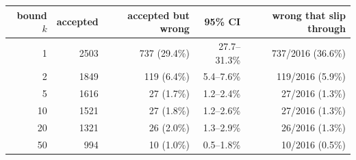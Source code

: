 \begin{tabular}{rrrrr}
\toprule
bound $k$ & accepted & accepted but wrong & 95\% CI & wrong that slip through \\
\midrule
1 & 2503 & 737 (29.4\%) & 27.7--31.3\% & 737/2016 (36.6\%) \\
2 & 1849 & 119 (6.4\%) & 5.4--7.6\% & 119/2016 (5.9\%) \\
5 & 1616 & 27 (1.7\%) & 1.2--2.4\% & 27/2016 (1.3\%) \\
10 & 1521 & 27 (1.8\%) & 1.2--2.6\% & 27/2016 (1.3\%) \\
20 & 1321 & 26 (2.0\%) & 1.3--2.9\% & 26/2016 (1.3\%) \\
50 & 994 & 10 (1.0\%) & 0.5--1.8\% & 10/2016 (0.5\%) \\
\bottomrule
\end{tabular}

